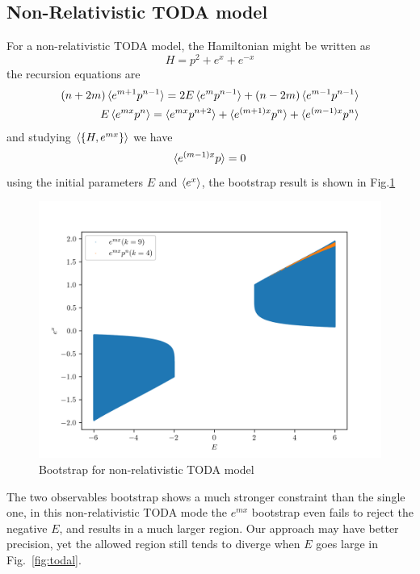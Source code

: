 \documentclass[aps, preprint,amsmath, amssymb]{revtex4-2}
\begin{document}
\subsection{Non-Relativistic TODA model}
For a non-relativistic TODA model, the Hamiltonian might be written as
\begin{equation}
    H = p^2 + e^x + e^{-x}
\end{equation}
the recursion equations are
\begin{align}
    (n + 2m)\braket{e^{m + 1} p^{n - 1}} = 2E\braket{e^m p^{n - 1}} + (n - 2m)\braket{e^{m - 1} p^{n - 1}}\notag \\
    E\braket{e^{mx} p^n} = \braket{e^{mx} p^{n + 2}} + \braket{e^{(m + 1)x} p^n} + \braket{e^{(m - 1)x} p^n}
\end{align}
and studying $\braket{\{H, e^{mx}\}}$ we have
\begin{equation}
    \braket{e^{(m - 1)x} p} = 0
\end{equation}
using the initial parameters $E$ and $\braket{e^x}$, the bootstrap result is shown in Fig.\ref{fig:toda}
\begin{figure}
    \includegraphics[width=0.8\linewidth]{toda_compare.png}
    \caption{Bootstrap for non-relativistic TODA model}
    \label{fig:toda}
\end{figure}

The two observables bootstrap shows a much stronger constraint than the single one, in this non-relativistic TODA mode the $e^{mx}$ bootstrap even fails to reject the negative $E$, and results in a much larger region. Our approach may have better precision, yet the allowed region still tends to diverge when $E$ goes large in Fig.~\ref{fig:todal}.
\end{document}

